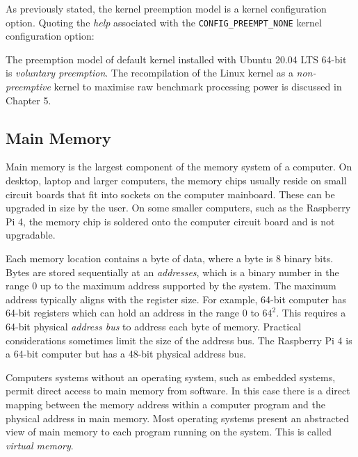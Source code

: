 As previously stated, the kernel preemption model is a kernel configuration option. Quoting the \emph{help} associated with the \verb|CONFIG_PREEMPT_NONE| kernel configuration option:


The preemption model of default kernel installed with Ubuntu 20.04 LTS 64-bit is \emph{voluntary preemption}. The recompilation of the Linux kernel as a \emph{non-preemptive} kernel to maximise raw benchmark processing power is discussed in Chapter 5.  


\subsection{Main Memory}

Main memory is the largest component of the memory system of a computer. On desktop, laptop and larger computers, the memory chips usually reside on small circuit boards that fit into sockets on the computer mainboard. These can be upgraded in size by the user. On some smaller computers, such as the Raspberry Pi 4, the memory chip is soldered onto the computer circuit board and is not upgradable.

Each memory location contains a byte of data, where a byte is 8 binary bits. Bytes are stored sequentially at an \emph{addresses}, which is a binary number in the range 0 up to the maximum address supported by the system. The maximum address typically aligns with the register size. For example, 64-bit computer has 64-bit registers which can hold an address in the range 0 to $64^2$. This requires a 64-bit physical \emph{address bus} to address each byte of memory. Practical considerations sometimes limit the size of the address bus. The Raspberry Pi 4 is a 64-bit computer but has a 48-bit physical address bus.

Computers systems without an operating system, such as embedded systems, permit direct access to main memory from software. In this case there is a direct mapping between the memory address within a computer program and the physical address in main memory. Most operating systems present an abstracted view of main memory to each program running on the system. This is called \emph{virtual memory}.
 
